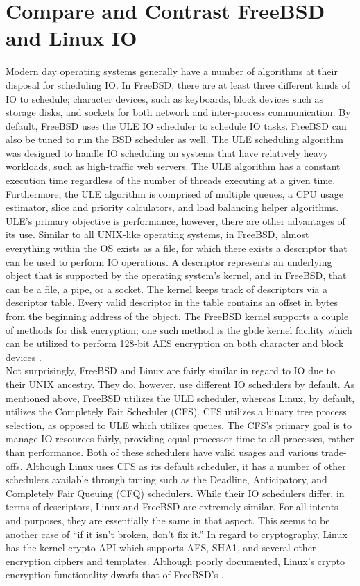 \documentclass[letterpaper,10pt,draftclsnofoot,onecolumn]{IEEEtran}
\begin{document}
\section{Compare and Contrast FreeBSD and Linux IO}
\noindent Modern day operating systems generally have a number of algorithms at their disposal for scheduling IO. In FreeBSD, there are at least three different kinds of IO to schedule; character devices, such as keyboards, block devices such as storage disks, and sockets for both network and inter-process communication. By default, FreeBSD uses the ULE IO scheduler to schedule IO tasks. FreeBSD can also be tuned to run the BSD scheduler as well. The ULE scheduling algorithm was designed to handle IO scheduling on systems that have relatively heavy workloads, such as high-traffic web servers. The ULE algorithm has a constant execution time regardless of the number of threads executing at a given time. Furthermore, the ULE algorithm is comprised of multiple queues, a CPU usage estimator, slice and priority calculators, and load balancing helper algorithms. ULE’s primary objective is performance, however, there are other advantages of its use. Similar to all UNIX-like operating systems, in FreeBSD, almost everything within the OS exists as a file, for which there exists a descriptor that can be used to perform IO operations. A descriptor represents an underlying object that is supported by the operating system’s kernel, and in FreeBSD, that can be a file, a pipe, or a socket. The kernel keeps track of descriptors via a descriptor table. Every valid descriptor in the table contains an offset in bytes from the beginning address of the object. The FreeBSD kernel supports a couple of methods for disk encryption; one such method is the gbde kernel facility which can be utilized to perform 128-bit AES encryption on both character and block devices \cite{FreeBSD1IO} \cite{FreeBSD2IO} \cite{FreeBSD3IO}.\\

\noindent Not surprisingly, FreeBSD and Linux are fairly similar in regard to IO due to their UNIX ancestry. They do, however, use different IO schedulers by default. As mentioned above, FreeBSD utilizes the ULE scheduler, whereas Linux, by default, utilizes the Completely Fair Scheduler (CFS). CFS utilizes a binary tree process selection, as opposed to ULE which utilizes queues. The CFS’s primary goal is to manage IO resources fairly, providing equal processor time to all processes, rather than performance. Both of these schedulers have valid usages and various trade-offs. Although Linux uses CFS as its default scheduler, it has a number of other schedulers available through tuning such as the Deadline, Anticipatory, and Completely Fair Queuing (CFQ) schedulers. While their IO schedulers differ, in terms of descriptors, Linux and FreeBSD are extremely similar. For all intents and purposes, they are essentially the same in that aspect. This seems to be another case of “if it isn’t broken, don’t fix it.” In regard to cryptography, Linux has the kernel crypto API which supports AES, SHA1, and several other encryption ciphers and templates. Although poorly documented, Linux’s crypto encryption functionality dwarfs that of FreeBSD’s \cite{Linux1IO} \cite{Linux2IO}.\\
\end{document}
